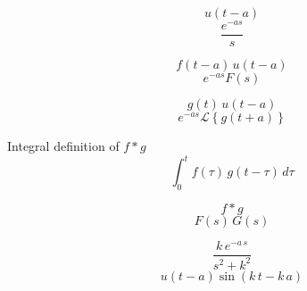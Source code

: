 \documentclass[grid, poker_portrait]{flashcards}
\begin{document}
  \begin{flashcard}{ \[ u(t - a) \] }
    \[
      \frac{e^{-as}}{s}
    \]
  \end{flashcard}

  \begin{flashcard}{ \[ f(t - a) \, u(t - a) \] }
    \[
      e^{-as} F(s)
    \]
  \end{flashcard}

  \begin{flashcard}{ \[ g(t) \, u(t - a) \] }
    \[
      e^{-as} \mathcal{L} \left \{ g(t + a) \right \}
    \]
  \end{flashcard}

  

  \begin{flashcard}{ Integral definition of $ f * g $ }
    \[
      \int_0^t f(\tau) \, g(t - \tau) \, d\tau
    \]
  \end{flashcard}

  \begin{flashcard}{ \[ f * g \] }
    \[
      F(s) \, G(s)
    \]
  \end{flashcard}






  \begin{flashcard}{ \[ \frac{ k\,e^{-a\,s} }{ s^2 + k^2} \] }
    \[
      u(t - a) \sin(k\,t - k\,a)
    \]
  \end{flashcard}
\end{document}
